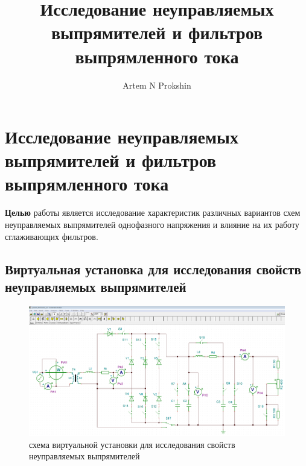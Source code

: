 

\title{Исследование неуправляемых выпрямителей и фильтров выпрямленного тока}
\author{Artem N Prokshin}



\section{Исследование неуправляемых выпрямителей и фильтров выпрямленного тока}

{\bf Целью} работы является исследование характеристик различных вариантов схем неуправляемых выпрямителей однофазного напряжения 
и влияние на их работу сглаживающих фильтров.
 
\subsection{Виртуальная установка для исследования свойств неуправляемых выпрямителей} 

\begin{figure}[!ht]
\centering
\includegraphics[scale=0.4, angle=90]{setup_lab2}
\caption{схема виртуальной установки для исследования свойств неуправляемых выпрямителей}
\label{setup}
\end{figure}

